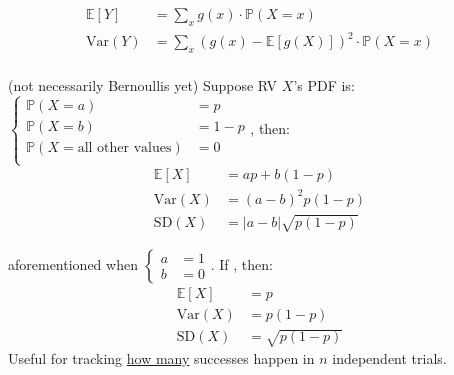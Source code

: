 \documentclass[10pt,landscape]{article}
\newcommand{\Red}[1]{\noindent{\textbf{\textcolor{BrickRed}{#1 -}}}}
\newcommand{\Green}[1]{\noindent{\textbf{\textcolor{PineGreen}{#1 -}}}}
\newcommand{\Hint}[1]{\noindent{\textcolor{Orange}{#1}}}
\begin{document}
\begin{multicols}{4}
\Green{Given $Y = g(X)$ and $X$'s PDF}
\begin{displaymath}
    \boxed{
        \begin{aligned}
            \mathbb{E}\left[Y\right] &= \sum_x g(x) \cdot \mathbb{P}(X = x) \\
            \text{Var}(Y) &= \sum_x \left(g(x) - \mathbb{E}\left[g(X)\right]\right)^2 \cdot \mathbb{P}(X = x) \\
        \end{aligned}
    }
\end{displaymath}

\Red{RVs with only 2 outcomes} (not necessarily Bernoullis yet)
Suppose RV $X$'s PDF is: $\begin{cases}
    \mathbb{P}(X = a) &= p \\
    \mathbb{P}(X = b) &= 1- p \\
    \mathbb{P}(X = \text{all other values}) &= 0 \\
\end{cases}$, then:
\begin{displaymath}
    \boxed{
        \begin{aligned}
            \mathbb{E}\left[X\right] &= ap + b(1-p) \\
            \text{Var}(X) &= (a-b)^2p(1-p) \\
            \text{SD}(X) &= |a-b| \sqrt{p (1-p)}
        \end{aligned}
    }
\end{displaymath}

\Red{Bernoulli Random Variable} aforementioned when $\begin{cases}
    a &= 1 \\
    b &= 0
\end{cases}$.
If , then:
\begin{displaymath}
    \boxed{
        \begin{aligned}
            \mathbb{E}\left[X\right] &= p \\
            \text{Var}(X) &= p(1-p) \\
            \text{SD}(X) &= \sqrt{p (1-p)}
        \end{aligned}
    }
\end{displaymath}
\Hint{
    \begin{itemize}
        \item Variance maximized when $p = 0.5$
        \item Variance minimized when $p = 0$ or $1$
    \end{itemize}
}
Useful for tracking \underline{how many} successes happen in $n$ independent trials.


\end{multicols}
\end{document}
